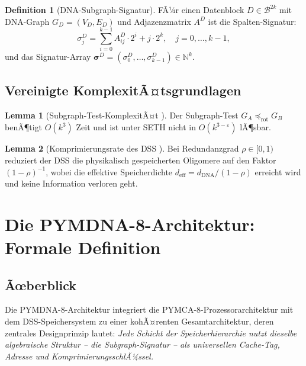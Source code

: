 ﻿\documentclass[a4paper,12pt]{article}
\theoremstyle{definition}
\newtheorem{definition}{Definition}[section]
\newtheorem{lemma}{Lemma}[section]
\begin{document}
\begin{definition}[DNA-Subgraph-Signatur]
  \label{def:signatur}
  FÃ¼r einen Datenblock $D \in \mathcal{B}^{2k}$ mit DNA-Graph
  $G_D = (V_D, E_D)$ und Adjazenzmatrix $A^D$ ist die Spalten-Signatur:
  \[
    \sigma_j^D = \sum_{i=0}^{k-1} A^D_{ij} \cdot 2^i + j \cdot 2^k,
    \quad j = 0,\ldots,k-1,
  \]
  und das Signatur-Array $\boldsymbol{\sigma}^D = (\sigma_0^D,\ldots,\sigma_{k-1}^D) \in \mathbb{N}^k$.
\end{definition}

\subsection{Vereinigte KomplexitÃ¤tsgrundlagen}

\begin{lemma}[Subgraph-Test-KomplexitÃ¤t \cite{epp2026subgraph}]
  \label{lem:subgraph_complexity}
  Der Subgraph-Test $G_A \preceq_{\mathrm{rot}} G_B$ benÃ¶tigt $O(k^3)$ Zeit
  und ist unter SETH nicht in $O(k^{3-\varepsilon})$ lÃ¶sbar.
\end{lemma}

\begin{lemma}[Komprimierungsrate des DSS \cite{epp2026dnastor}]
  \label{lem:komprimierung}
  Bei Redundanzgrad $\rho \in [0,1)$ reduziert der DSS die physikalisch
  gespeicherten Oligomere auf den Faktor $(1-\rho)^{-1}$, wobei die
  effektive Speicherdichte $d_{\mathrm{eff}} = d_{\mathrm{DNA}} / (1-\rho)$
  erreicht wird und keine Information verloren geht.
\end{lemma}

\section{Die PYMDNA-8-Architektur: Formale Definition}

\subsection{Ãœberblick}

Die PYMDNA-8-Architektur integriert die PYMCA-8-Prozessorarchitektur
\cite{epp2026pymca8} mit dem DSS-Speichersystem \cite{epp2026dnastor}
zu einer kohÃ¤renten Gesamtarchitektur, deren zentrales Designprinzip
lautet: \emph{Jede Schicht der Speicherhierarchie nutzt dieselbe
algebraische Struktur -- die Subgraph-Signatur -- als universellen
Cache-Tag, Adresse und KomprimierungsschlÃ¼ssel.}
\end{document}
